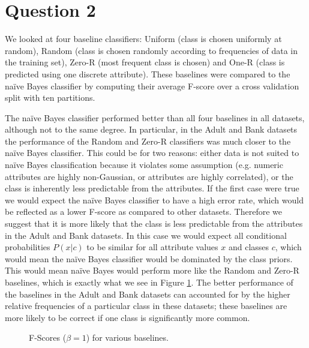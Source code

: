 \documentclass[11pt]{article}
\begin{document}
    \pagebreak
    \section*{Question 2}
    We looked at four baseline classifiers: Uniform (class is chosen uniformly at random), Random (class is chosen randomly according to frequencies of data in the training set), Zero-R (most frequent class is chosen) and One-R (class is predicted using one discrete attribute). These baselines were compared to the na\"{i}ve Bayes classifier by computing their average F-score over a cross validation split with ten partitions. 

    The na\"{i}ve Bayes classifier performed better than all four baselines in all datasets, although not to the same degree. In particular, in the Adult and Bank datasets the performance of the Random and Zero-R classifiers was much closer to the na\"{i}ve Bayes classifier. This could be for two reasons: either data is not suited to na\"{i}ve Bayes classification because it violates some assumption (e.g. numeric attributes are highly non-Gaussian, or attributes are highly correlated), or the class is inherently less predictable from the attributes. If the first case were true we would expect the na\"{i}ve Bayes classifier to have a high error rate, which would be reflected as a lower F-score as compared to other datasets. Therefore we suggest that it is more likely that the class is less predictable from the attributes in the Adult and Bank datasets. In this case we would expect all conditional probabilities $P(x|c)$ to be similar for all attribute values $x$ and classes $c$, which would mean the na\"{i}ve Bayes classifier would be dominated by the class priors. This would mean na\"{i}ve Bayes would perform more like the Random and Zero-R baselines, which is exactly what we see in Figure \ref{fig:q2-baseline-fscores}. The better performance of the baselines in the Adult and Bank datasets can accounted for by the higher relative frequencies of a particular class in these datasets; these baselines are more likely to be correct if one class is significantly more common.


    \begin{figure}[H]
        \centering
        \def\svgwidth{\columnwidth}
        \fbox{\scalebox{0.8}{}}
        \caption{F-Scores ($\beta = 1$) for various baselines.}
        \label{fig:q2-baseline-fscores}
    \end{figure}

    \pagebreak
\end{document}
